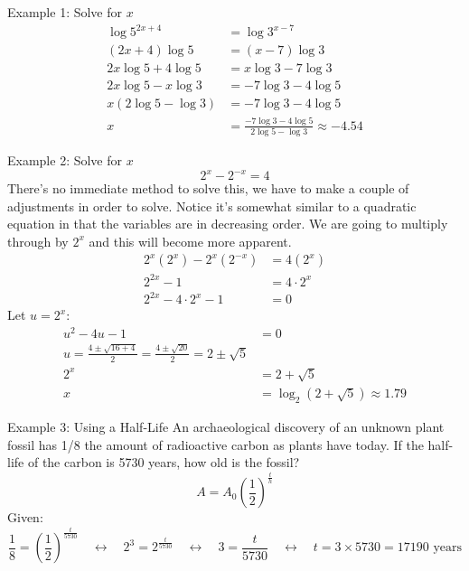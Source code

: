 \documentclass{article}
\begin{document}
\begin{examplebox}{Example 1: Solve for \( x \)}
\begin{align*}
    \log{5^{2x+4}} &= \log{3^{x-7}}\\
    (2x+4) \log{5} &= (x-7) \log{3}\\
    2x \log{5} + 4 \log{5} &= x \log{3} - 7 \log{3}\\
    2x \log{5} - x \log{3} &= -7 \log{3} - 4 \log{5}\\
    x (2 \log{5} - \log{3}) &= -7 \log{3} - 4 \log{5}\\
    x &= \frac{-7 \log{3} - 4 \log{5}}{2 \log{5} - \log{3}} \approx -4.54
\end{align*}
\end{examplebox}
\begin{examplebox}{Example 2: Solve for \( x \)}
\[
2^x - 2^{-x} = 4
\]
There's no immediate method to solve this, we have to make a couple of adjustments in order to solve. Notice it's somewhat similar to a quadratic equation in that the variables are in decreasing order. We are going to multiply through by \( 2^x \) and this will become more apparent.
\begin{align*}
    2^x (2^x) - 2^x (2^{-x}) &= 4 (2^x)\\
    2^{2x} - 1 &= 4 \cdot 2^x\\
    2^{2x} - 4 \cdot 2^x - 1 &= 0
\end{align*}
Let \( u = 2^x \):
\begin{align*}
    u^2 - 4u - 1 &= 0\\
    u = \frac{4 \pm \sqrt{16 + 4}}{2} = \frac{4 \pm \sqrt{20}}{2} = 2 \pm \sqrt{5}\\
    2^x &= 2 + \sqrt{5}\\
    x &= \log_2 (2 + \sqrt{5}) \approx 1.79
\end{align*}
\end{examplebox}

\begin{examplebox}{Example 3: Using a Half-Life}
An archaeological discovery of an unknown plant fossil has 1/8 the amount of radioactive carbon as plants have today. If the half-life of the carbon is 5730 years, how old is the fossil?
\[
A = A_0 \left(\frac{1}{2}\right)^{\frac{t}{h}}
\]
Given:
\[
\frac{1}{8} = \left(\frac{1}{2}\right)^{\frac{t}{5730}} \quad \leftrightarrow \quad 2^3 = 2^{\frac{t}{5730}} \quad \leftrightarrow \quad 3 = \frac{t}{5730} \quad \leftrightarrow \quad t = 3 \times 5730 = 17190 \text{ years}
\]
\end{examplebox}
\end{document}
